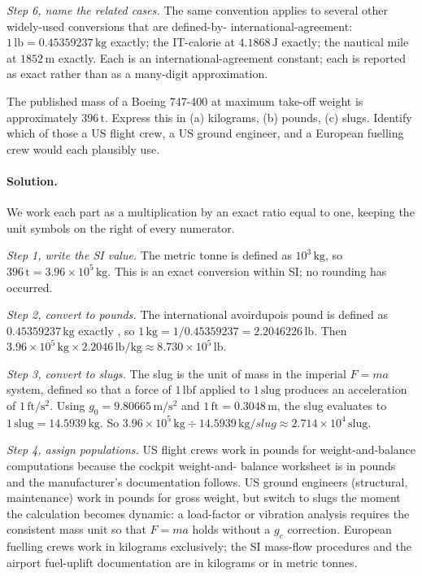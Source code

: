 \begin{exercise}
\textit{Step 6, name the related cases.} The same convention applies
to several other widely-used conversions that are defined-by-
international-agreement: $1 \,\text{lb} = 0.45359237 \,\si{\kilogram}$
exactly; the IT-calorie at $4.1868 \,\si{\joule}$ exactly; the
nautical mile at $1852 \,\si{\meter}$ exactly. Each is an
international-agreement constant; each is reported as exact rather
than as a many-digit approximation.
\end{exercise}

\begin{exercise}
The published mass of a Boeing 747-400 at maximum take-off weight is
approximately $396 \,\si{\tonne}$. Express this in (a) kilograms,
(b) pounds, (c) slugs. Identify which of those a US flight crew, a
US ground engineer, and a European fuelling crew would each
plausibly use.

\paragraph{Solution.}
We work each part as a multiplication by an exact ratio equal to one,
keeping the unit symbols on the right of every numerator.

\textit{Step 1, write the SI value.} The metric tonne is defined as
$10^{3} \,\si{\kilogram}$, so
$396 \,\si{\tonne} = 3.96 \times 10^{5} \,\si{\kilogram}$. This is an
exact conversion within SI; no rounding has occurred.

\textit{Step 2, convert to pounds.} The international avoirdupois pound
is defined as $0.45359237 \,\si{\kilogram}$ exactly
\cite{std:nist-sp811}, so
$1 \,\si{\kilogram} = 1/0.45359237 = 2.2046226\,\text{lb}$. Then
$3.96 \times 10^{5} \,\si{\kilogram} \times 2.2046\,\text{lb}/\si{
\kilogram} \approx 8.730 \times 10^{5}\,\text{lb}$.

\textit{Step 3, convert to slugs.} The slug is the unit of mass in
the imperial $F = ma$ system, defined so that a force of $1\,\text{lbf}$
applied to $1\,\text{slug}$ produces an acceleration of
$1\,\text{ft}/\text{s}^{2}$. Using $g_{0} = 9.80665 \,\si{\meter\per
\second\squared}$ and $1\,\text{ft} = 0.3048 \,\si{\meter}$, the slug
evaluates to $1\,\text{slug} = 14.5939 \,\si{\kilogram}$. So
$3.96 \times 10^{5} \,\si{\kilogram} \div 14.5939 \,\si{\kilogram\per
slug} \approx 2.714 \times 10^{4}\,\text{slug}$.

\textit{Step 4, assign populations.} US flight crews work in pounds
for weight-and-balance computations because the cockpit weight-and-
balance worksheet is in pounds and the manufacturer's documentation
follows. US ground engineers (structural, maintenance) work in pounds
for gross weight, but switch to slugs the moment the calculation
becomes dynamic: a load-factor or vibration analysis requires the
consistent mass unit so that $F = ma$ holds without a $g_{c}$
correction. European fuelling crews work in kilograms exclusively; the
SI mass-flow procedures and the airport fuel-uplift documentation are
in kilograms or in metric tonnes.


\end{exercise}
